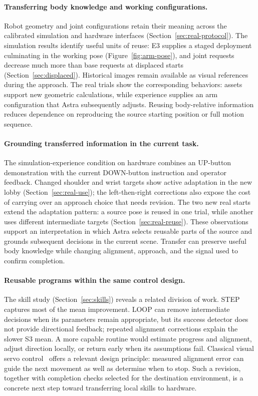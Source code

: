 \documentclass[11pt]{article}
\begin{document}
\paragraph{Transferring body knowledge and working configurations.}
Robot geometry and joint configurations retain their meaning across the calibrated simulation and hardware interfaces (Section~\ref{sec:real-protocol}). The simulation results identify useful units of reuse: E3 supplies a staged deployment culminating in the working pose (Figure~\ref{fig:arm-pose}), and joint requests decrease much more than base requests at displaced starts (Section~\ref{sec:displaced}). Historical images remain available as visual references during the approach. The real trials show the corresponding behaviors: assets support new geometric calculations, while experience supplies an arm configuration that Astra subsequently adjusts. Reusing body-relative information reduces dependence on reproducing the source starting position or full motion sequence.

\paragraph{Grounding transferred information in the current task.}
The simulation-experience condition on hardware combines an UP-button demonstration with the current DOWN-button instruction and operator feedback. Changed shoulder and wrist targets show active adaptation in the new lobby (Section~\ref{sec:real-use}); the left-then-right corrections also expose the cost of carrying over an approach choice that needs revision. The two new real starts extend the adaptation pattern: a source pose is reused in one trial, while another uses different intermediate targets (Section~\ref{sec:real-reuse}). These observations support an interpretation in which Astra selects reusable parts of the source and grounds subsequent decisions in the current scene. Transfer can preserve useful body knowledge while changing alignment, approach, and the signal used to confirm completion.

\paragraph{Reusable programs within the same control design.}
The skill study (Section~\ref{sec:skills}) reveals a related division of work. STEP captures most of the mean improvement. LOOP can remove intermediate decisions when its parameters remain appropriate, but its success detector does not provide directional feedback; repeated alignment corrections explain the slower S3 mean. A more capable routine would estimate progress and alignment, adjust direction locally, or return early when its assumptions fail. Classical visual servo control~\cite{chaumette2006visual} offers a relevant design principle: measured alignment error can guide the next movement as well as determine when to stop. Such a revision, together with completion checks selected for the destination environment, is a concrete next step toward transferring local skills to hardware.
\end{document}
